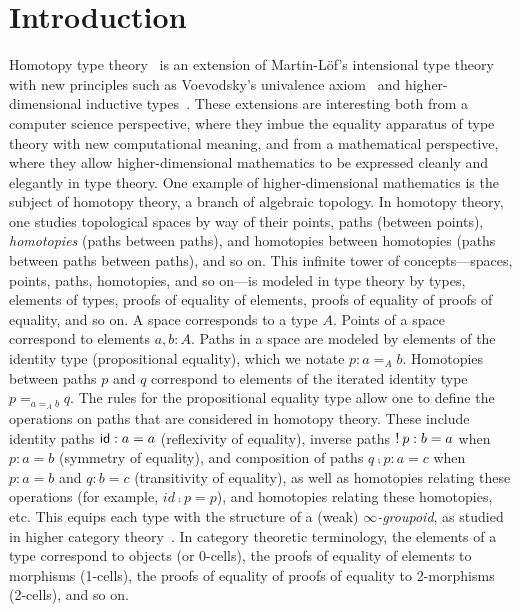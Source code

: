 \newcommand\Z{\ensuremath{\mathbb{Z}}}

\section{Introduction}

Homotopy type theory~\citep{awodeywarren09identity,voevodsky11wollic} is an extension of Martin-L\"of's
intensional type theory with new principles such as Voevodsky's
univalence axiom~\citep{nps90mltt,hofmann97syntaxandsemantics,martinlof71itt}  %
and higher-dimensional inductive
types~\citep{lumsdaine+13hits}.  These extensions are interesting both from a
computer science perspective, where they imbue the equality apparatus of
type theory with new computational meaning, and from a mathematical
perspective, where they allow higher-dimensional mathematics to be
expressed cleanly and elegantly in type theory.  One example of
higher-dimensional mathematics is the subject of homotopy theory, a
branch of algebraic topology.  In homotopy theory, one studies
topological spaces by way of their points, paths (between points),
\emph{homotopies}  %
(paths between paths), and homotopies between
homotopies (paths between paths between paths), and so on.  This infinite tower of concepts---spaces,
points, paths, homotopies, and so on---is modeled in type theory by
types, elements of types, proofs of equality of elements, proofs of
equality of proofs of equality, and so on.  A space corresponds to a
type $A$. Points of a space correspond to elements $a,b : A$. Paths in a
space are modeled by elements of the identity type (propositional equality), which we
notate $p : a =_A b$.  Homotopies between paths $p$ and $q$ correspond
to elements of the iterated identity type $p =_{a =_A b} q$.  The
rules for the propositional equality type allow one to define the
operations on paths that are considered in homotopy theory.  These include identity paths
$\mathsf{id} : a = a$ (reflexivity of equality), inverse paths $! \: p : b
= a$ when $p : a = b$ (symmetry of equality), and composition of paths
$q \comp p : a = c$ when $p : a = b$ and $q : b = c$ (transitivity of
equality), as well as homotopies relating these operations (for example,
$id \comp p = p$), and homotopies relating these homotopies, etc.  This
equips each type with the structure of a (weak)
\emph{$\infty$-groupoid}, as studied in higher category
theory~\citep{lumsdaine09omega,vandenberggarner10groupoids}.  In category theoretic terminology, the elements of
a type correspond to objects (or 0-cells), the proofs of equality of
elements to morphisms (1-cells), the proofs of equality of proofs of
equality to 2-morphisms (2-cells), and so on.

